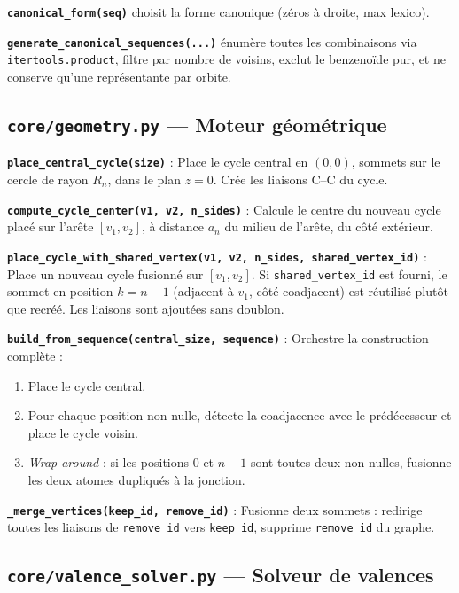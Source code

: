 \documentclass[a4paper,12pt]{article}
\begin{document}
\textbf{\texttt{canonical\_form(seq)}} choisit la forme canonique (zéros à droite, max lexico).

\textbf{\texttt{generate\_canonical\_sequences(...)}} énumère toutes les combinaisons via
\texttt{itertools.product}, filtre par nombre de voisins, exclut le benzenoïde pur, et ne
conserve qu'une représentante par orbite.

\subsection{\texttt{core/geometry.py} — Moteur géométrique}

\textbf{\texttt{place\_central\_cycle(size)}} :
Place le cycle central en $(0, 0)$, sommets sur le cercle de rayon $R_n$, dans le plan $z=0$.
Crée les liaisons C--C du cycle.

\textbf{\texttt{compute\_cycle\_center(v1, v2, n\_sides)}} :
Calcule le centre du nouveau cycle placé sur l'arête $[v_1, v_2]$, à distance $a_n$ du milieu
de l'arête, du côté extérieur.

\textbf{\texttt{place\_cycle\_with\_shared\_vertex(v1, v2, n\_sides, shared\_vertex\_id)}} :
Place un nouveau cycle fusionné sur $[v_1, v_2]$. Si \texttt{shared\_vertex\_id} est fourni,
le sommet en position $k = n-1$ (adjacent à $v_1$, côté coadjacent) est réutilisé plutôt que
recréé. Les liaisons sont ajoutées sans doublon.

\textbf{\texttt{build\_from\_sequence(central\_size, sequence)}} :
Orchestre la construction complète :
\begin{enumerate}
  \item Place le cycle central.
  \item Pour chaque position non nulle, détecte la coadjacence avec le prédécesseur et place
    le cycle voisin.
  \item \textit{Wrap-around} : si les positions 0 et $n-1$ sont toutes deux non nulles, fusionne
    les deux atomes dupliqués à la jonction.
\end{enumerate}

\textbf{\texttt{\_merge\_vertices(keep\_id, remove\_id)}} :
Fusionne deux sommets : redirige toutes les liaisons de \texttt{remove\_id} vers
\texttt{keep\_id}, supprime \texttt{remove\_id} du graphe.

\subsection{\texttt{core/valence\_solver.py} — Solveur de valences}
\end{document}
